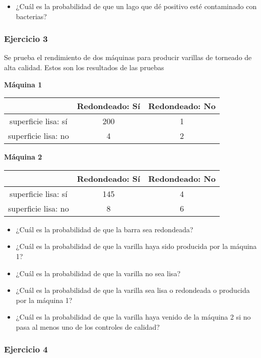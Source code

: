 \documentclass[
]{book}
\providecommand{\tightlist}{%
  \setlength{\itemsep}{0pt}\setlength{\parskip}{0pt}}
\begin{document}
\begin{itemize}
\tightlist
\item
  ¿Cuál es la probabilidad de que un lago que dé positivo esté contaminado con bacterias?
\end{itemize}

\hypertarget{ejercicio-3}{%
\subsubsection{Ejercicio 3}\label{ejercicio-3}}

Se prueba el rendimiento de dos máquinas para producir varillas de torneado de alta calidad. Estos son los resultados de las pruebas

\textbf{Máquina 1}

\begin{longtable}[]{@{}ccc@{}}
\toprule
& Redondeado: Sí & Redondeado: No \\
\midrule
\endhead
superficie lisa: sí & 200 & 1 \\
superficie lisa: no & 4 & 2 \\
\bottomrule
\end{longtable}

\textbf{Máquina 2}

\begin{longtable}[]{@{}ccc@{}}
\toprule
& Redondeado: Sí & Redondeado: No \\
\midrule
\endhead
superficie lisa: sí & 145 & 4 \\
superficie lisa: no & 8 & 6 \\
\bottomrule
\end{longtable}

\begin{itemize}
\tightlist
\item
  ¿Cuál es la probabilidad de que la barra sea redondeada?
\item
  ¿Cuál es la probabilidad de que la varilla haya sido producida por la máquina 1?
\item
  ¿Cuál es la probabilidad de que la varilla no sea lisa?
\item
  ¿Cuál es la probabilidad de que la varilla sea lisa o redondeada o producida por la máquina 1?
\item
  ¿Cuál es la probabilidad de que la varilla haya venido de la máquina 2 si no pasa al menos uno de los controles de calidad?
\end{itemize}

\hypertarget{ejercicio-4}{%
\subsubsection{Ejercicio 4}\label{ejercicio-4}}
\end{document}

